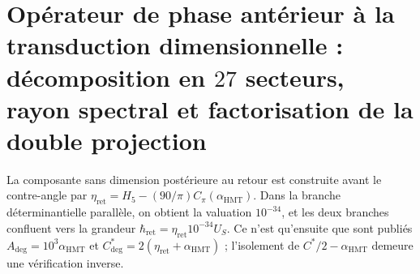 

\HMTFlushCurrentChapter
\chapter{Opérateur de phase antérieur à la transduction dimensionnelle : décomposition en \(27\) secteurs, rayon spectral et factorisation de la double projection}%
\begingroup
\renewcommand{\chapter}[2][]{}%
%
\endgroup

\HMTFlushCurrentChapter
\chapter{Équivalence exacte des cartes globale et analytique de la paire angulaire : degrés, radians, phases \texorpdfstring{\(q_{\pm}\)}{q+/-} et orientation complémentaire}
\label{chap:p3-final:38:angulo_contraangulo}
La composante sans dimension postérieure au retour est construite avant le contre-angle par \(\eta_{\mathrm{ret}}=H_5-(90/\pi)C_\pi(\alpha_{\mathrm{HMT}})\).
Dans la branche déterminantielle parallèle, on obtient la valuation \(10^{-34}\), et les deux branches confluent vers la grandeur \(\hbar_{\mathrm{ret}}=\eta_{\mathrm{ret}}10^{-34}U_S\).
Ce n'est qu'ensuite que sont publiés \(A_{\mathrm{deg}}=10^3\alpha_{\mathrm{HMT}}\) et \(C^*_{\mathrm{deg}}=2(\eta_{\mathrm{ret}}+\alpha_{\mathrm{HMT}})\) ; l'isolement de \(C^*/2-\alpha_{\mathrm{HMT}}\) demeure une vérification inverse.


\HMTFlushCurrentChapter
\chapter{Opérateur constitutif positif du vide : complétion \(3\to4\), reconstruction spectrale et dérivation conjointe de \texorpdfstring{\(\varepsilon,\mu,Z\)}{epsilon, mu, Z} et \(c\)}%
\begingroup
\renewcommand{\chapter}[2][]{}%
%
\endgroup

